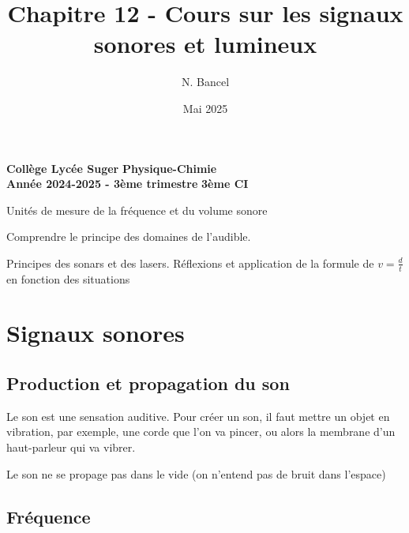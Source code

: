 \documentclass[a4paper,12pt]{article}
\title{Chapitre 12 - Cours sur les signaux sonores et lumineux}
\author{N. Bancel}
\date{Mai 2025}
\begin{document}
\textbf{Collège Lycée Suger}
\hfill
\textbf{Physique-Chimie} \\

\textbf{Année 2024-2025 - 3ème trimestre}
\hfill
\textbf{3ème CI} \par

{\let\newpage\relax\maketitle}


\begin{tcolorbox}[colback=blue!10!white, colframe=blue!75!black, title=Concepts importants à retenir]
  \begin{compactitem}
    \item Unités de mesure de la fréquence et du volume sonore 
    \item Comprendre le principe des domaines de l'audible.
    \item Principes des sonars et des lasers. Réflexions et application de la formule de $v=\frac{d}{t}$ en fonction des situations
  \end{compactitem}
\end{tcolorbox}

\section*{Signaux sonores}

\subsection*{Production et propagation du son}

\begin{compactitem}
\item Le son est une sensation auditive. Pour créer un son, il faut mettre un objet en vibration, par exemple, une corde que l’on va pincer, ou alors la membrane d’un haut-parleur qui va vibrer.
\item Le son ne se propage pas dans le vide (on n'entend pas de bruit dans l'espace)
\end{compactitem}

\subsection*{Fréquence}
\end{document}
